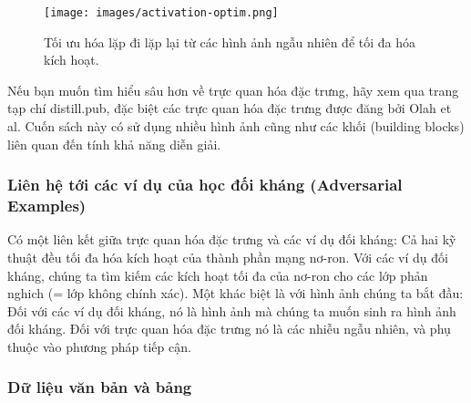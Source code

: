 \begin{figure*}[h!]
	\centering
	\texttt{[image: images/activation-optim.png]}
	\label{fig:7_4}
	\caption{Tối ưu hóa lặp đi lặp lại từ các hình ảnh ngẫu nhiên để tối đa hóa kích hoạt.}
\end{figure*}

Nếu bạn muốn tìm hiểu sâu hơn về trực quan hóa đặc trưng, hãy xem qua trang tạp chí distill.pub, đặc biệt các trực quan hóa đặc trưng được đăng bởi Olah et al. Cuốn sách này có sử dụng nhiều hình ảnh cũng như các khối (building blocks) liên quan đến tính khả năng diễn giải.

\subsubsection{Liên hệ tới các ví dụ của học đối kháng  (Adversarial Examples)}

Có một liên kết giữa trực quan hóa đặc trưng và các ví dụ đối kháng: Cả hai kỹ thuật đều tối đa hóa kích hoạt của thành phần mạng nơ-ron. Với các ví dụ đối kháng, chúng ta tìm kiếm các kích hoạt tối đa của nơ-ron cho các lớp phản nghich (= lớp không chính xác). Một khác biệt là với hình ảnh chúng ta bắt đầu: Đối với các ví dụ đối kháng, nó là hình ảnh mà chúng ta muốn sinh ra hình ảnh đối kháng. Đối với trực quan hóa đặc trưng nó là các nhiễu ngẫu nhiên, và phụ thuộc vào phương pháp tiếp cận.

\subsubsection{Dữ liệu văn bản và bảng}

